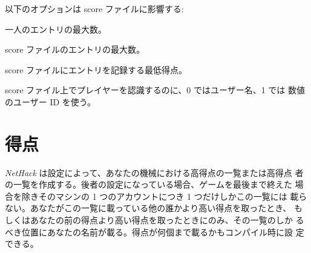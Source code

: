 以下のオプションは score ファイルに影響する:
\blist {}
\item[\ib{PERSMAX}]
一人のエントリの最大数。
\item[\ib{ENTRYMAX}]
score ファイルのエントリの最大数。
\item[\ib{POINTSMIN}]
score ファイルにエントリを記録する最低得点。
\item[\ib{PERS\verb+_+IS\verb+_+UID}]
score ファイル上でプレイヤーを認識するのに、0 ではユーザー名、1 では
数値のユーザー ID を使う。
\elist

\section{得点}

{\it NetHack\/} は設定によって、あなたの機械における高得点の一覧または高得点
者の一覧を作成する。後者の設定になっている場合、ゲームを最後まで終えた
場合を除きそのマシンの 1 つのアカウントにつき 1 つだけしかこの一覧には
載らない。あなたがこの一覧に載っている他の誰かより高い得点を取ったとき、
もしくはあなたの前の得点より高い得点を取ったときにのみ、その一覧のしか
るべき位置にあなたの名前が載る。得点が何個まで載るかもコンパイル時に設
定できる。

